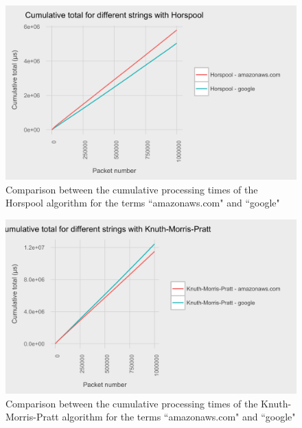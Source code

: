\documentclass{article}
\begin{document}
\begin{figure}[h!bt]
  \centering
  \includegraphics[width=\textwidth]{graphs/term_length_compare-horspool.png}
  \caption{Comparison between the cumulative processing times of the Horspool algorithm for the terms ``amazonaws.com" and ``google"}
\end{figure}

\begin{figure}[h!bt]
  \centering
  \includegraphics[width=\textwidth]{graphs/term_length_compare-knuth-morris-pratt.png}
  \caption{Comparison between the cumulative processing times of the Knuth-Morris-Pratt algorithm for the terms ``amazonaws.com" and ``google"}
\end{figure}
\end{document}

